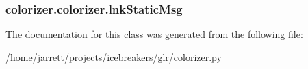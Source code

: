 \hypertarget{classcolorizer_1_1colorizer_a7de7f95380dcbbdaf401badbf25cd0a5}{
\subsubsection[{lnk\-Static\-Msg}]{\setlength{\rightskip}{0pt plus 5cm}colorizer.\-colorizer.\-lnk\-Static\-Msg}}\label{classcolorizer_1_1colorizer_a7de7f95380dcbbdaf401badbf25cd0a5}


The documentation for this class was generated from the following file\-:\begin{DoxyCompactItemize}
\item 
/home/jarrett/projects/icebreakers/glr/\hyperlink{colorizer_8py}{colorizer.\-py}\end{DoxyCompactItemize}
